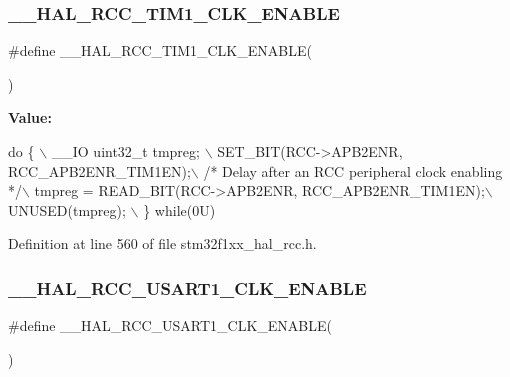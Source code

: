 \subsubsection{\texorpdfstring{\+\_\+\+\_\+\+H\+A\+L\+\_\+\+R\+C\+C\+\_\+\+T\+I\+M1\+\_\+\+C\+L\+K\+\_\+\+E\+N\+A\+B\+LE}{\_\_HAL\_RCC\_TIM1\_CLK\_ENABLE}}
{\footnotesize\ttfamily \#define \+\_\+\+\_\+\+H\+A\+L\+\_\+\+R\+C\+C\+\_\+\+T\+I\+M1\+\_\+\+C\+L\+K\+\_\+\+E\+N\+A\+B\+LE(\begin{DoxyParamCaption}{ }\end{DoxyParamCaption})}

{\bfseries Value\+:}
\begin{DoxyCode}
\textcolor{keywordflow}{do} \{ \(\backslash\)
                                        \_\_IO uint32\_t tmpreg; \(\backslash\)
                                        SET\_BIT(RCC->APB2ENR, RCC\_APB2ENR\_TIM1EN);\(\backslash\)
                                        \textcolor{comment}{/* Delay after an RCC peripheral clock enabling */}\(\backslash\)
                                        tmpreg = READ\_BIT(RCC->APB2ENR, RCC\_APB2ENR\_TIM1EN);\(\backslash\)
                                        UNUSED(tmpreg); \(\backslash\)
                                      \} \textcolor{keywordflow}{while}(0U)
\end{DoxyCode}


Definition at line 560 of file stm32f1xx\+\_\+hal\+\_\+rcc.\+h.

\mbox{\label{group___r_c_c___a_p_b2___clock___enable___disable_ga932afe7cea6c567ad63e0f83308b9d3e}} 
\subsubsection{\texorpdfstring{\+\_\+\+\_\+\+H\+A\+L\+\_\+\+R\+C\+C\+\_\+\+U\+S\+A\+R\+T1\+\_\+\+C\+L\+K\+\_\+\+E\+N\+A\+B\+LE}{\_\_HAL\_RCC\_USART1\_CLK\_ENABLE}}
{\footnotesize\ttfamily \#define \+\_\+\+\_\+\+H\+A\+L\+\_\+\+R\+C\+C\+\_\+\+U\+S\+A\+R\+T1\+\_\+\+C\+L\+K\+\_\+\+E\+N\+A\+B\+LE(\begin{DoxyParamCaption}{ }\end{DoxyParamCaption})}

